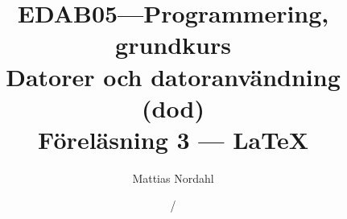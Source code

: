\documentclass[handout]{beamer}
\author[]{Mattias Nordahl}
\institute{\url{mattias.nordahl@cs.lth.se}}
\date{}
\begin{document}
\title{{\small\bf EDAB05---Programmering, grundkurs}\\Datorer och datoranvändning (dod)\\Föreläsning 3 --- \LaTeX}

\frame[plain]{
    \maketitle
    \vspace{-2\baselineskip}
}

\date{\the\year/\the\numexpr{}}


\end{document}
